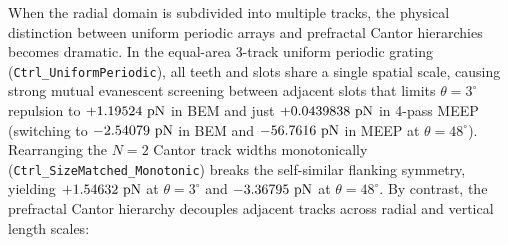 \documentclass[11pt,letterpaper]{article}
\begin{document}
When the radial domain is subdivided into multiple tracks, the physical distinction between uniform periodic arrays and prefractal Cantor hierarchies becomes dramatic. In the equal-area 3-track uniform periodic grating (\texttt{Ctrl\_UniformPeriodic}), all teeth and slots share a single spatial scale, causing strong mutual evanescent screening between adjacent slots that limits $\theta=3^\circ$ repulsion to $+1.19524{}\text{ pN}$ in BEM and just $+0.0439838{}\text{ pN}$ in 4-pass MEEP (switching to $-2.54079{}\text{ pN}$ in BEM and $-56.7616{}\text{ pN}$ in MEEP at $\theta=48^\circ$). Rearranging the $N=2$ Cantor track widths monotonically (\texttt{Ctrl\_SizeMatched\_Monotonic}) breaks the self-similar flanking symmetry, yielding $+1.54632{}\text{ pN}$ at $\theta=3^\circ$ and $-3.36795{}\text{ pN}$ at $\theta=48^\circ$. By contrast, the prefractal Cantor hierarchy decouples adjacent tracks across radial and vertical length scales:
\end{document}
